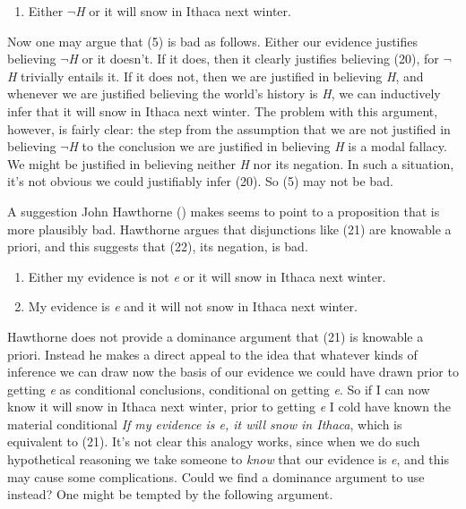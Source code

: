 \documentclass[
  11pt,
  letterpaper,
  DIV=11,
  numbers=noendperiod,
  oneside]{scrartcl}
\providecommand{\tightlist}{%
  \setlength{\itemsep}{0pt}\setlength{\parskip}{0pt}}\usepackage{longtable,booktabs,array}
\begin{document}
\begin{enumerate}
\def\labelenumi{\arabic{enumi}.}
\setcounter{enumi}{19}
\tightlist
\item
  Either \(\neg\)\emph{H} or it will snow in Ithaca next winter.
\end{enumerate}

Now one may argue that (5) is bad as follows. Either our evidence
justifies believing \(\neg\)\emph{H} or it doesn't. If it does, then it
clearly justifies believing (20), for \(\neg\)\emph{H} trivially entails
it. If it does not, then we are justified in believing \emph{H}, and
whenever we are justified believing the world's history is \emph{H}, we
can inductively infer that it will snow in Ithaca next winter. The
problem with this argument, however, is fairly clear: the step from the
assumption that we are not justified in believing \(\neg\)\emph{H} to
the conclusion we are justified in believing \emph{H} is a modal
fallacy. We might be justified in believing neither \emph{H} nor its
negation. In such a situation, it's not obvious we could justifiably
infer (20). So (5) may not be bad.

A suggestion John Hawthorne () makes
seems to point to a proposition that is more plausibly bad. Hawthorne
argues that disjunctions like (21) are knowable a priori, and this
suggests that (22), its negation, is bad.

\begin{enumerate}
\def\labelenumi{\arabic{enumi}.}
\setcounter{enumi}{20}
\item
  Either my evidence is not \emph{e} or it will snow in Ithaca next
  winter.
\item
  My evidence is \emph{e} and it will not snow in Ithaca next winter.
\end{enumerate}

Hawthorne does not provide a dominance argument that (21) is knowable a
priori. Instead he makes a direct appeal to the idea that whatever kinds
of inference we can draw now the basis of our evidence we could have
drawn prior to getting \emph{e} as conditional conclusions, conditional
on getting \emph{e}. So if I can now know it will snow in Ithaca next
winter, prior to getting \emph{e} I cold have known the material
conditional \emph{If my evidence is e, it will snow in Ithaca}, which is
equivalent to (21). It's not clear this analogy works, since when we do
such hypothetical reasoning we take someone to \emph{know} that our
evidence is \emph{e}, and this may cause some complications. Could we
find a dominance argument to use instead? One might be tempted by the
following argument.
\end{document}
